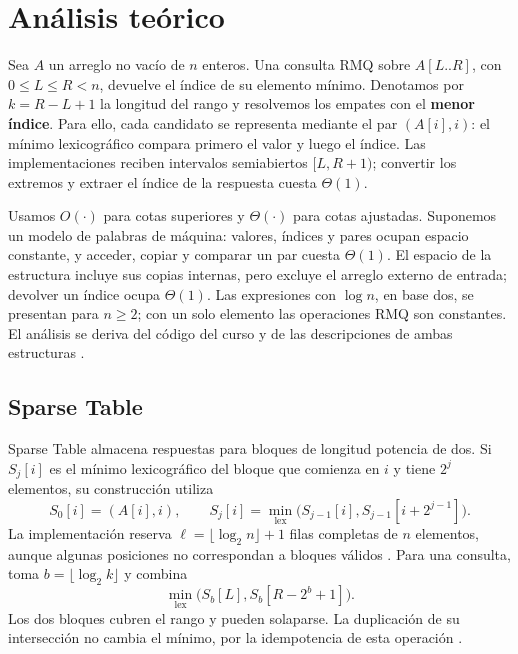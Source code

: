 \section{Análisis teórico}

Sea \(A\) un arreglo no vacío de \(n\) enteros. Una consulta RMQ sobre
\(A[L..R]\), con \(0\leq L\leq R<n\), devuelve el índice de su elemento
mínimo. Denotamos por \(k=R-L+1\) la longitud del rango y resolvemos los
empates con el \textbf{menor índice}. Para ello, cada candidato se representa
mediante el par \((A[i],i)\): el mínimo lexicográfico compara primero el valor
y luego el índice. Las implementaciones reciben intervalos semiabiertos
\([L,R+1)\); convertir los extremos y extraer el índice de la respuesta cuesta
\(\Theta(1)\).

Usamos \(O(\cdot)\) para cotas superiores y
\(\Theta(\cdot)\) para cotas ajustadas. Suponemos un modelo de palabras de
máquina: valores, índices y pares ocupan espacio constante, y acceder, copiar
y comparar un par cuesta \(\Theta(1)\). El espacio de la estructura incluye
sus copias internas, pero excluye el arreglo externo de entrada; devolver un
índice ocupa \(\Theta(1)\). Las expresiones con \(\log n\), en base dos,
se presentan para \(n\geq2\); con un solo elemento las operaciones RMQ son
constantes. El análisis se deriva del código del curso y de las descripciones
de ambas estructuras \cite{edaa-sparse-table,edaa-segment-tree,cp-sparse-table,cp-segment-tree}.

\subsection{Sparse Table}

Sparse Table almacena respuestas para bloques de longitud potencia de dos.
Si \(S_j[i]\) es el mínimo lexicográfico del bloque que comienza en \(i\)
y tiene \(2^j\) elementos, su construcción utiliza
\[
    S_0[i]=(A[i],i),\qquad
    S_j[i]=\min_{\mathrm{lex}}\bigl(S_{j-1}[i],
                              S_{j-1}[i+2^{j-1}]\bigr).
\]
La implementación reserva \(\ell=\lfloor\log_2 n\rfloor+1\) filas
completas de \(n\) elementos, aunque algunas posiciones no correspondan a
bloques válidos \cite{edaa-sparse-table}. Para una consulta, toma
\(b=\lfloor\log_2 k\rfloor\) y combina
\[
    \min_{\mathrm{lex}}\bigl(S_b[L],S_b[R-2^b+1]\bigr).
\]
Los dos bloques cubren el rango y pueden solaparse. La duplicación de su
intersección no cambia el mínimo, por la idempotencia de esta operación
\cite{cp-sparse-table}.

